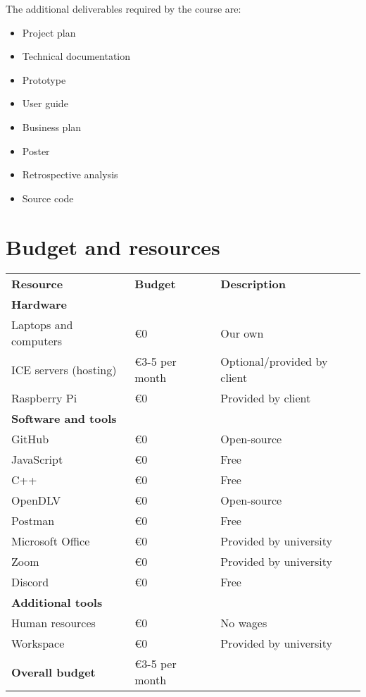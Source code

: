 \noindent
The additional deliverables required by the course are:

\begin{itemize}
	\item Project plan
	\item Technical documentation
	\item Prototype
	\item User guide
	\item Business plan
	\item Poster
	\item Retrospective analysis
	\item Source code
\end{itemize}

\section{Budget and resources}\label{sec:budget}

\begin{table}[H]
	\centering
	\begin{tabularx}{\textwidth}{ l l X }
		\textbf{Resource} & \textbf{Budget} & \textbf{Description} \\
		\rowcolor[HTML]{C0C0C0}
		\textbf{Hardware} & & \\
		Laptops and computers & €0 & Our own \\
		\rowcolor[HTML]{E7E7E7}
		ICE servers (hosting) & €3-5 per month & Optional/provided by client \\
		Raspberry Pi & €0 & Provided by client \\
		\rowcolor[HTML]{C0C0C0}
		\textbf{Software and tools} & & \\
		GitHub & €0 & Open-source \\
		\rowcolor[HTML]{E7E7E7}
		JavaScript & €0 & Free \\
		C++ & €0 & Free \\
		\rowcolor[HTML]{E7E7E7}
		OpenDLV & €0 & Open-source \\
		Postman & €0 & Free \\
		\rowcolor[HTML]{E7E7E7}
		Microsoft Office & €0 & Provided by university \\
		Zoom & €0 & Provided by university \\
		\rowcolor[HTML]{E7E7E7}
		Discord & €0 & Free \\
		\rowcolor[HTML]{C0C0C0}
		\textbf{Additional tools} & & \\
		Human resources & €0 & No wages \\
		\rowcolor[HTML]{E7E7E7}
		Workspace & €0 & Provided by university \\
		\rowcolor[HTML]{C0C0C0}
		\textbf{Overall budget} & €3-5 per month & \\
	\end{tabularx}
	\label{table:f-req-1}
\end{table}
